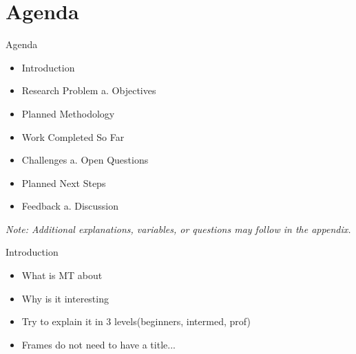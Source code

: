 \section{Agenda}
\begin{frame}{Agenda}
    \begin{itemize}
        \item Introduction 
        \item Research Problem a. Objectives
        \item Planned Methodology
        \item Work Completed So Far
        \item Challenges a. Open Questions
        \item Planned Next Steps
        \item Feedback a. Discussion
    \end{itemize}

    \vspace{0.5cm}
    \seprule

    \textit{Note: Additional explanations, variables, or questions may follow in the appendix.}
\end{frame}

\begin{frame}{Introduction}
	\begin{itemize}
	    \item What is MT about
            \item Why is it interesting
            \item Try to explain it in 3 levels(beginners, intermed, prof)
	\end{itemize}
	\begin{itemize}
		\item Frames do not need to have a title...
	\end{itemize}
\end{frame}

